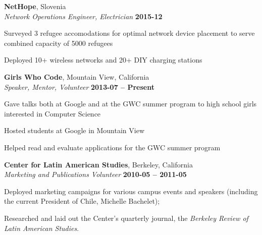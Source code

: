 \documentclass[margin,line]{resume}
\begin{document}
\begin{resume}
  \textbf{NetHope}, Slovenia \vspace{1mm}\\\vspace{0mm}%
  \textsl{Network Operations Engineer, Electrician} \hfill \textbf{2015-12}\vspace{0mm}\vspace{0mm}%
  \begin{list2}
    \item Surveyed 3 refugee accomodations for optimal network device placement to serve combined capacity of 5000 refugees
    \item Deployed 10+ wireless networks and 20+ DIY charging stations
  \end{list2}

  \textbf{Girls Who Code}, Mountain View, California \vspace{1mm}\\\vspace{0mm}%
  \textsl{Speaker, Mentor, Volunteer} \hfill \textbf{2013-07 -- Present}\vspace{0mm}\vspace{0mm}%
  \begin{list2}
    \item Gave talks both at Google and at the GWC summer program to high school girls interested in Computer Science
    \item Hosted students at Google in Mountain View
    \item Helped read and evaluate applications for the GWC summer program
  \end{list2}

	\textbf{Center for Latin American Studies}, Berkeley, California \vspace{1mm}\\\vspace{0mm}%
    \textsl{Marketing and Publications Volunteer} \hfill \textbf{2010-05 -- 2011-05}\vspace{0mm}\vspace{0mm}%
	\begin{list2}
		\item Deployed marketing campaigns for various campus events and speakers (including the current President of Chile, Michelle Bachelet);
		\item Researched and laid out the Center's quarterly journal, the \emph{Berkeley Review of Latin American Studies}.
	\end{list2}


\end{resume}
\end{document}
